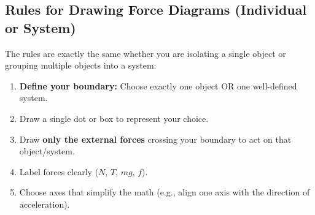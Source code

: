 \documentclass{article}
\begin{document}
\subsection{Rules for Drawing Force Diagrams (Individual or System)}
The rules are exactly the same whether you are isolating a single object or grouping multiple objects into a system:
\begin{enumerate}
  \item \textbf{Define your boundary:} Choose exactly one object OR one well-defined system.
  \item Draw a single dot or box to represent your choice.
  \item Draw \textbf{only the external forces} crossing your boundary to act on that object/system.
  \item Label forces clearly ($N$, $T$, $mg$, $f$).
  \item Choose axes that simplify the math (e.g., align one axis with the direction of acceleration).
\end{enumerate}
\end{document}
